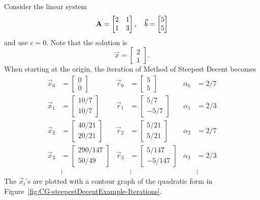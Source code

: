 \begin{example}
\label{ex:CG-SteepestDecent}
Consider the linear system
\[
	\mathbf{A} = \begin{bmatrix}
		2 & 1 \\
		1 & 3
	\end{bmatrix},
	\quad
	\vec{b} = \begin{bmatrix}
		5 \\
		5 
	\end{bmatrix}
\]
and use \(c=0\).
Note that the solution is
\[
	\vec{x} = \begin{bmatrix}
		2 \\ 1
	\end{bmatrix}.
\]
When starting at the origin, the iteration of Method of Steepest Decent becomes
\begin{align*}
	 \vec{x}_0 &= \begin{bmatrix}0\\0\end{bmatrix}
	&\vec{r}_0 &= \begin{bmatrix}5\\5\end{bmatrix}
	&\alpha_0  &= 2/7 \\
	 \vec{x}_1 &= \begin{bmatrix}10/7\\10/7\end{bmatrix}
	&\vec{r}_1 &= \begin{bmatrix}5/7\\-5/7\end{bmatrix}
	&\alpha_1  &= 2/3 \\
	 \vec{x}_2 &= \begin{bmatrix}40/21\\20/21\end{bmatrix}
	&\vec{r}_2 &= \begin{bmatrix}5/21\\5/21\end{bmatrix}
	&\alpha_2  &= 2/7 \\
	 \vec{x}_3 &= \begin{bmatrix}290/147\\50/49\end{bmatrix}
	&\vec{r}_3 &= \begin{bmatrix}5/147\\-5/147\end{bmatrix}
	&\alpha_3  &= 2/3 \\
	&\vdots &&\vdots &&\vdots
\end{align*}
The \(\vec{x}_i\)'s are plotted with a contour graph of the quadratic form in Figure~\ref{fig:CG-steepestDecentExample-Iterations}.

\end{example}

